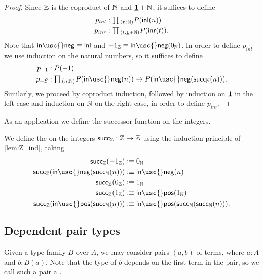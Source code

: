 \begin{proof}
  Since ${\mathbb{Z}}$ is the coproduct of ${\mathbb{N}}$ and $\underline{\mathbf{1}}+{\mathbb{N}}$, it suffices to define
  \begin{align*}
    p_{inl} & : \prd{n:\N}P(\inl(n)) \\
    p_{inr} & : \prd{t:\unit+\N}P(\inr(t)).
  \end{align*}
  Note that $\mathsf{in\usc{}neg}\jdeq\inl$ and $-1_\Z\jdeq \mathsf{in\usc{}neg}(\zeroN)$. In order to define $p_{inl}$ we use induction on the natural numbers, so it suffices to define
  \begin{align*}
    p_{-1} & : P(-1) \\
    p_{-S} & : \prd{n:\N} P(\mathsf{in\usc{}neg}(n))\to P(\mathsf{in\usc{}neg}(\succN(n))).
  \end{align*}
  Similarly, we proceed by coproduct induction, followed by induction on $\underline{\mathbf{1}}$ in the left case and induction on ${\mathbb{N}}$ on the right case, in order to define $p_{inr}$. 
\end{proof}

As an application we define the successor function on the integers.

\begin{defn}
We define the  on the integers $\mathsf{succ}_{{\mathbb{Z}}}:{\mathbb{Z}}\to{\mathbb{Z}}$ using the induction principle of \cref{lem:Z_ind}, taking
\begin{align*}
\succZ(-1_\Z) & \defeq 0_\N \\
\succZ(\mathsf{in\usc{}neg}(\succN(n))) & \defeq \mathsf{in\usc{}neg}(n) \\
\succZ(0_\Z) & \defeq 1_\N \\
\succZ(1_\Z) & \defeq \mathsf{in\usc{}pos}(1_\N) \\
\succZ(\mathsf{in\usc{}pos}(\succN(n))) & \defeq \mathsf{in\usc{}pos}(\succN(\succN(n))).
\end{align*}
\end{defn}

\subsection{Dependent pair types}


Given a type family $B$ over $A$, we may consider pairs $(a,b)$ of terms, where $a:A$ and $b:B(a)$. Note that the type of $b$ depends on the first term in the pair, so we call such a pair a .

